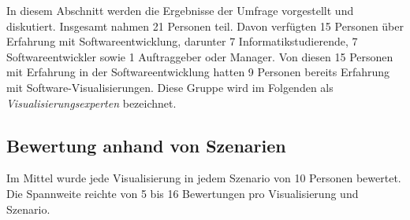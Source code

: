 In diesem Abschnitt werden die Ergebnisse der Umfrage vorgestellt und diskutiert. Insgesamt nahmen 21 Personen teil. Davon verfügten 15 Personen über Erfahrung mit Softwareentwicklung, darunter 7 Informatikstudierende, 7 Softwareentwickler sowie 1 Auftraggeber oder Manager. Von diesen 15 Personen mit Erfahrung in der Softwareentwicklung hatten 9 Personen bereits Erfahrung mit Software-Visualisierungen. Diese Gruppe wird im Folgenden als \textit{Visualisierungsexperten} bezeichnet.


\subsection{Bewertung anhand von Szenarien} \label{sec:BewertungSzenarienErgebnisse}

Im Mittel wurde jede Visualisierung in jedem Szenario von 10 Personen bewertet. Die Spannweite reichte von 5 bis 16 Bewertungen pro Visualisierung und Szenario.

